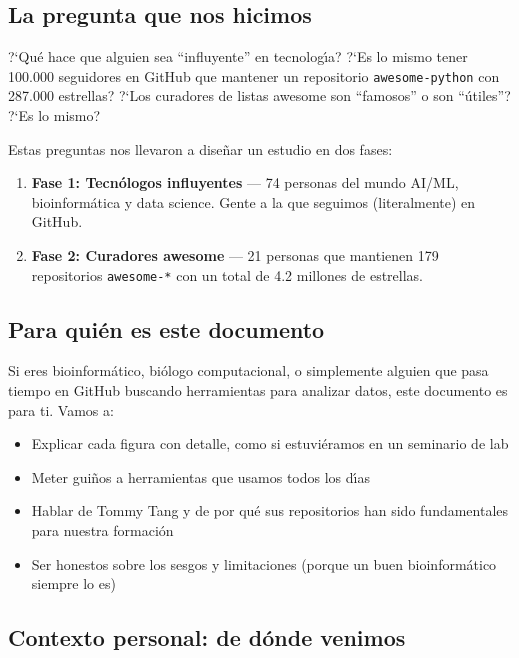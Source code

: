 \documentclass[11pt]{article}
\begin{document}
\subsection{La pregunta que nos hicimos}

?`Qu\'{e} hace que alguien sea ``influyente'' en tecnolog\'{\i}a? ?`Es lo mismo tener 100.000 seguidores en GitHub que mantener un repositorio \texttt{awesome-python} con 287.000 estrellas? ?`Los curadores de listas awesome son ``famosos'' o son ``\'{u}tiles''? ?`Es lo mismo?

Estas preguntas nos llevaron a dise\~{n}ar un estudio en dos fases:

\begin{enumerate}
    \item \textbf{Fase 1: Tecn\'{o}logos influyentes} --- 74 personas del mundo AI/ML, bioinform\'{a}tica y data science. Gente a la que seguimos (literalmente) en GitHub.
    \item \textbf{Fase 2: Curadores awesome} --- 21 personas que mantienen 179 repositorios \texttt{awesome-*} con un total de 4.2 millones de estrellas.
\end{enumerate}

\subsection{Para qui\'{e}n es este documento}

Si eres bioinform\'{a}tico, bi\'{o}logo computacional, o simplemente alguien que pasa tiempo en GitHub buscando herramientas para analizar datos, este documento es para ti. Vamos a:

\begin{itemize}
    \item Explicar cada figura con detalle, como si estuvi\'{e}ramos en un seminario de lab
    \item Meter gui\~{n}os a herramientas que usamos todos los d\'{\i}as
    \item Hablar de Tommy Tang y de por qu\'{e} sus repositorios han sido fundamentales para nuestra formaci\'{o}n
    \item Ser honestos sobre los sesgos y limitaciones (porque un buen bioinform\'{a}tico siempre lo es)
\end{itemize}

\subsection{Contexto personal: de d\'{o}nde venimos}
\end{document}

